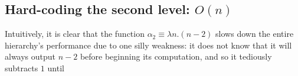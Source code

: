 
\subsection{Hard-coding the second level: $O(n)$} \label{sect: hard-code-lvl2}

Intuitively, it is clear that the function $\alpha_2 \equiv \lambda n.(n-2)$
slows down the entire hierarchy's performance due to one silly weakness:
it does not know that it will always output $n-2$ before beginning its computation,
and so it tediously subtracts $1$ until 

